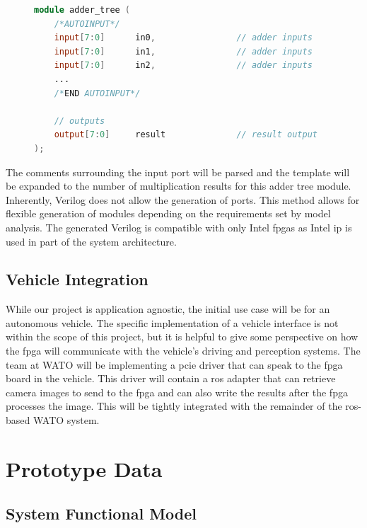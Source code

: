 \documentclass{uw-ece-wkrpt}
\begin{document}
\begin{figure}
\centering
\begin{lstlisting}[caption={Verilog template}, label=lst:verilog_template, language=Verilog]
module adder_tree (
    /*AUTOINPUT*/
    input[7:0]      in0,                // adder inputs
    input[7:0]      in1,                // adder inputs
    input[7:0]      in2,                // adder inputs
    ...
    /*END AUTOINPUT*/

    // outputs
    output[7:0]     result              // result output
);
\end{lstlisting}
\end{figure}

The comments surrounding the input port will be parsed and the template will be expanded to the number of multiplication results for this adder tree module. Inherently, Verilog does not allow the generation of ports. This method allows for flexible generation of modules depending on the requirements set by model analysis. The generated Verilog is compatible with only Intel \glspl{fpga} as Intel \gls{ip} is used in part of the system architecture.

\subsection{Vehicle Integration}

While our project is application agnostic, the initial use case will be for an autonomous vehicle. The specific implementation of a vehicle interface is not within the scope of this project, but it is helpful to give some perspective on how the \gls{fpga} will communicate with the vehicle's driving and perception systems. The team at WATO will be implementing a \gls{pcie} driver that can speak to the \gls{fpga} board in the vehicle. This driver will contain a \gls{ros} adapter that can retrieve camera images to send to the \gls{fpga} and can also write the results after the \gls{fpga} processes the image. This will be tightly integrated with the remainder of the \gls{ros}-based WATO system.


\section{Prototype Data}

\subsection{System Functional Model}
\end{document}
